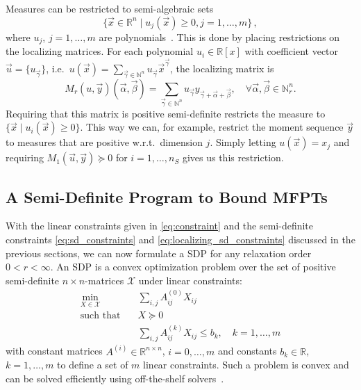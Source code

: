 Measures can be restricted to semi-algebraic sets
$$\{\vec x\in\mathbb{R}^n \mid u_j(\vec x)\geq 0, j=1,\dots,m\}\,,$$
where $u_j$, $j=1,\dots,m$ are polynomials~\cite{lasserre2010moments}.
This is done by placing restrictions on the {localizing matrices}.
For each polynomial $u_i\in\mathbb{R}[x]$ with coefficient vector
$\vec{u}=\{u_{\vec\gamma}\}$,
i.e.\ $u(\vec x) = \sum_{\vec{\gamma}\in\mathbb{N}^n} u_{\vec{\gamma}}
\vec{x}^{\vec{\gamma}}$,
the localizing matrix is
$$ M_r(u, \vec{y})(\vec{\alpha}, \vec{\beta})=
\sum_{\vec\gamma\in\mathbb{N}^n}u_{\vec\gamma}
y_{\vec\gamma+\vec\alpha+\vec\beta},\quad
\forall\vec{\alpha},\vec{\beta}\in\mathbb{N}^n_r.$$
Requiring that this matrix is positive semi-definite restricts the measure to
$\{\vec{x}\mid u_i(\vec{x})\geq 0\}$.
This way we can, for example, restrict the moment sequence $\vec{y}$
to measures that are positive w.r.t.\ dimension $j$.
Simply letting $u(\vec{x}) = x_j$ and requiring
$M_1(\vec{u},\vec{y})\succeq 0$ for $i=1,\dots,n_S$ gives us this restriction.


\subsection{A Semi-Definite Program to Bound MFPTs}
With the linear constraints given in \eqref{eq:constraint}
and the semi-definite constraints \eqref{eq:sd_constraints} and \eqref{eq:localizing_sd_constraints} 
discussed in the previous sections, we can now formulate a
\acf{SDP} for any relaxation order $0<r<\infty$.
An \ac{SDP} is a convex optimization problem over the set of positive semi-definite $n \times n$-matrices
$\mathcal{X}$ under linear constraints:
\begin{equation}
    \label{eq:sdp_canonical}
    \begin{split}
        \min_{X\in\mathcal{X}} \hspace{1em} & \sum_{i,j} A_{ij}^{(0)}X_{ij} \\
        \text{such that} \hspace{1em}
                 & X\succeq 0\\
            & \sum_{i,j} A_{ij}^{(k)}X_{ij} \leq b_k, \quad k=1,\dots,m
    \end{split}
\end{equation}
with constant matrices $A^{(i)}\in \mathbb{R}^{n\times n}$, $i=0,\dots,m$ and
constants $b_k\in\mathbb{R}$, $k=1,\dots,m$ to define a set of $m$ linear constraints.
Such a problem is convex and can be solved efficiently using off-the-shelf solvers~\cite{vandenberghe2010cvxopt}.

